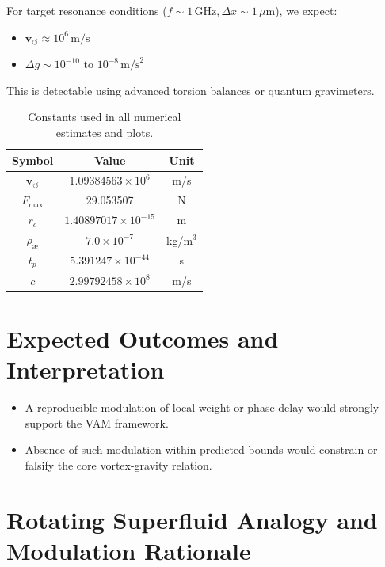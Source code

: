 \documentclass[preprint]{revtex4-2}
\begin{document}
    For target resonance conditions (\( f \sim 1 \, \text{GHz}, \Delta x \sim 1 \, \mu\text{m} \)), we expect:
    \begin{itemize}
        \item \( \mathbf{v}_{\scriptscriptstyle\boldsymbol{\circlearrowleft}} \approx 10^6 \, \text{m/s} \)
        \item \( \Delta g \sim 10^{-10} \text{ to } 10^{-8} \, \text{m/s}^2 \)
    \end{itemize}
    This is detectable using advanced torsion balances or quantum gravimeters.

    \begin{table}[h!]
        \centering
        \begin{tabular}{|c|c|c|}
            \hline
            \textbf{Symbol} & \textbf{Value} & \textbf{Unit} \\
            \hline
            \( \mathbf{v}_{\scriptscriptstyle\boldsymbol{\circlearrowleft}} \) & \( 1.09384563 \times 10^6 \) & m/s \\
            \( F_{\text{max}} \) & 29.053507 & N \\
            \( r_c \) & \( 1.40897017 \times 10^{-15} \) & m \\
            \( \rho_\text{\ae} \) & \( 7.0 \times 10^{-7} \) & kg/m$^3$ \\
            \( t_p \) & \( 5.391247 \times 10^{-44} \) & s \\
            \( c \) & \( 2.99792458 \times 10^8 \) & m/s \\
            \hline
        \end{tabular}
        \caption{Constants used in all numerical estimates and plots.}
    \end{table}


    \section*{Expected Outcomes and Interpretation}
    \begin{itemize}
        \item A reproducible modulation of local weight or phase delay would strongly support the VAM framework.
        \item Absence of such modulation within predicted bounds would constrain or falsify the core vortex-gravity relation.
    \end{itemize}

    \section*{Rotating Superfluid Analogy and Modulation Rationale}
\end{document}
